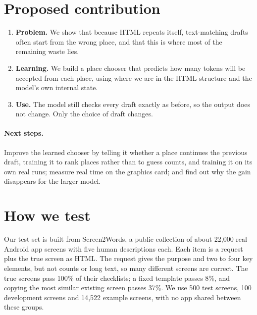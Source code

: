\documentclass[10pt,a4paper]{article}
\begin{document}
\section{Proposed contribution}
\begin{enumerate}[itemsep=1pt]
\item \textbf{Problem.} We show that because HTML repeats itself, text-matching drafts often start from the wrong place, and that this is where most of the remaining waste lies.
\item \textbf{Learning.} We build a place chooser that predicts how many tokens will be accepted from each place, using where we are in the HTML structure and the model's own internal state.
\item \textbf{Use.} The model still checks every draft exactly as before, so the output does not change. Only the choice of draft changes.
\end{enumerate}

\paragraph{Next steps.} Improve the learned chooser by telling it whether a place continues the previous draft, training it to rank places rather than to guess counts, and training it on its own real runs; measure real time on the graphics card; and find out why the gain disappears for the larger model.

\section{How we test}
Our test set is built from Screen2Words, a public collection of about 22{,}000 real Android app screens with five human descriptions each. Each item is a request plus the true screen as HTML. The request gives the purpose and two to four key elements, but not counts or long text, so many different screens are correct. The true screens pass 100\% of their checklists; a fixed template passes 8\%, and copying the most similar existing screen passes 37\%. We use 500 test screens, 100 development screens and 14{,}522 example screens, with no app shared between these groups.
\end{document}
